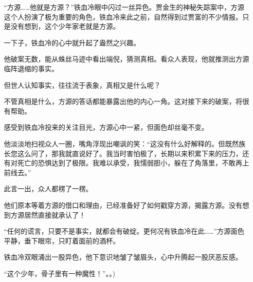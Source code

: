 \begin{this_body}
“方源……他就是方源？”铁血冷眼中闪过一丝异色。贾金生的神秘失踪案中，方源这个人扮演了极为重要的角色，铁血冷来此之前，自然得到过贾富的不少情报。只是没有想到，这个少年家老就是方源。

一下子，铁血冷的心中就升起了盎然之兴趣。

他破案无数，能从蛛丝马迹中看出端倪，猜测真相。看众人表现，他就推测出方源临阵退缩的事实。

但世人认知事实，往往流于表象，真相又是什么呢？

不管真相是什么，方源的答话都能暴露出他的内心一角。这对接下来的破案，将很有帮助。

感受到铁血冷投来的关注目光，方源心中一紧，但面色却丝毫不变。

他淡淡地扫视众人一圈，嘴角浮现出嘲讽的笑：“这没有什么好解释的。但既然族长您这么问了，那我就直说好了。我当时害怕极了，长期以来积累下来的压力，还有对死亡的恐惧达到了极限。我难以承受，我懦弱胆小，躲在了角落里，不敢再上前线去。”

此言一出，众人都楞了一楞。

他们原本等着方源的借口和理由，已经准备好了如何戳穿方源，揭露方源。没有想到方源居然直接就承认了！

“任何的谎言，只要不是事实，就都会有破绽。更何况有铁血冷在此……”方源面色平静，垂下眼帘，只盯着面前的酒杯。

铁血冷双眼涌出一股异色，他下意识地皱了皱眉头，心中升腾起一股厌恶反感。

“这个少年，骨子里有一种魔性！”。。)

\end{this_body}

